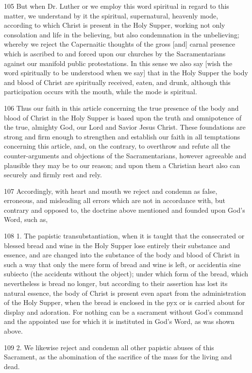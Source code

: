 105 But when Dr. Luther or we employ this word spiritual in regard to this matter, we understand by it the spiritual, supernatural, heavenly mode, according to which Christ is present in the Holy Supper, working not only consolation and life in the believing, but also condemnation in the unbelieving; whereby we reject the Capernaitic thoughts of the gross [and] carnal presence which is ascribed to and forced upon our churches by the Sacramentarians against our manifold public protestations. In this sense we also say [wish the word spiritually to be understood when we say] that in the Holy Supper the body and blood of Christ are spiritually received, eaten, and drunk, although this participation occurs with the mouth, while the mode is spiritual.

106 Thus our faith in this article concerning the true presence of the body and blood of Christ in the Holy Supper is based upon the truth and omnipotence of the true, almighty God, our Lord and Savior Jesus Christ. These foundations are strong and firm enough to strengthen and establish our faith in all temptations concerning this article, and, on the contrary, to overthrow and refute all the counter-arguments and objections of the Sacramentarians, however agreeable and plausible they may be to our reason; and upon them a Christian heart also can securely and firmly rest and rely.

107 Accordingly, with heart and mouth we reject and condemn as false, erroneous, and misleading all errors which are not in accordance with, but contrary and opposed to, the doctrine above mentioned and founded upon God’s Word, such as,

108 1. The papistic transubstantiation, when it is taught that the consecrated or blessed bread and wine in the Holy Supper lose entirely their substance and essence, and are changed into the substance of the body and blood of Christ in such a way that only the mere form of bread and wine is left, or accidentia sine subiecto (the accidents without the object); under which form of the bread, which nevertheless is bread no longer, but according to their assertion has lost its natural essence, the body of Christ is present even apart from the administration of the Holy Supper, when the bread is enclosed in the pyx or is carried about for display and adoration. For nothing can be a sacrament without God’s command and the appointed use for which it is instituted in God’s Word, as was shown above.

109 2. We likewise reject and condemn all other papistic abuses of this Sacrament, as the abomination of the sacrifice of the mass for the living and dead.

